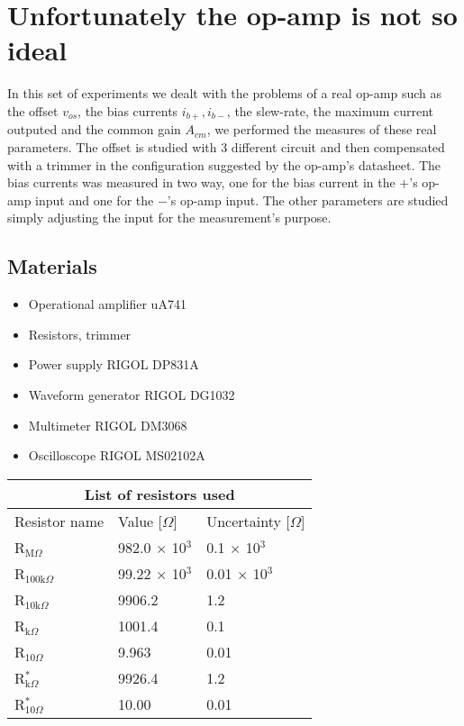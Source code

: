 \chapter{Unfortunately the op-amp is not so ideal}
In this set of experiments we dealt with the problems of a real op-amp such as the offset $v_{os}$, the bias currents $i_{b+},i_{b-}$, the slew-rate, the maximum current outputed and the common gain $A_{cm}$, we performed the measures of these real parameters. The offset is studied with 3 different circuit and then compensated with a trimmer in the configuration suggested by the op-amp's datasheet. The bias currents was measured in two way, one for the bias current in the $+$'s op-amp input and one for the $-$'s op-amp input. The other parameters are studied simply adjusting the input for the measurement's purpose.

\section{Materials}
\begin{itemize}
\item Operational amplifier uA741
\item Resistors, trimmer
\item Power supply RIGOL DP831A
\item Waveform generator RIGOL DG1032
\item Multimeter RIGOL DM3068
\item Oscilloscope RIGOL MS02102A
\end{itemize}

\begin{tabular}{ |p{3cm}||p{3cm}|p{3cm}| }
 \hline
 \multicolumn{3}{|c|}{List of resistors used} \\
 \hline
 Resistor name & Value [$\Omega$] & Uncertainty [$\Omega$]\\
 \hline
 R$_{\text{M}\Omega}$   & 982.0 $\times$ 10$^3$ & 0.1 $\times$ 10$^3$  \\
 R$_{100\text{k}\Omega}$& 99.22 $\times$ 10$^3$ & 0.01 $\times$ 10$^3$ \\
 R$_{10\text{k}\Omega}$ &   9906.2            & 1.2         \\
 R$_{\text{k}\Omega}$   &  1001.4             & 0.1         \\
 R$_{10\Omega}$         &  9.963              & 0.01        \\
 R$_{\text{k}\Omega}^*$ &  9926.4             & 1.2         \\
 R$_{10\Omega}^*$       &10.00                & 0.01        \\
 
 \hline
\end{tabular}
